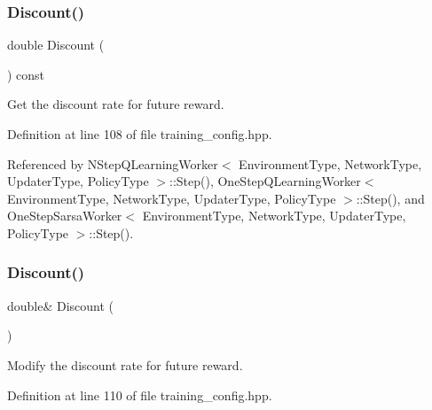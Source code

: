 \subsubsection{Discount()\hspace{0.1cm}{\footnotesize\ttfamily [1/2]}}
{\footnotesize\ttfamily double Discount (\begin{DoxyParamCaption}{ }\end{DoxyParamCaption}) const\hspace{0.3cm}{\ttfamily [inline]}}



Get the discount rate for future reward. 



Definition at line 108 of file training\+\_\+config.\+hpp.



Referenced by N\+Step\+Q\+Learning\+Worker$<$ Environment\+Type, Network\+Type, Updater\+Type, Policy\+Type $>$\+::\+Step(), One\+Step\+Q\+Learning\+Worker$<$ Environment\+Type, Network\+Type, Updater\+Type, Policy\+Type $>$\+::\+Step(), and One\+Step\+Sarsa\+Worker$<$ Environment\+Type, Network\+Type, Updater\+Type, Policy\+Type $>$\+::\+Step().

\mbox{\label{classmlpack_1_1rl_1_1TrainingConfig_acac458c2ea9b4b4f1d48bd9cff986bae}} 
\subsubsection{Discount()\hspace{0.1cm}{\footnotesize\ttfamily [2/2]}}
{\footnotesize\ttfamily double\& Discount (\begin{DoxyParamCaption}{ }\end{DoxyParamCaption})\hspace{0.3cm}{\ttfamily [inline]}}



Modify the discount rate for future reward. 



Definition at line 110 of file training\+\_\+config.\+hpp.

\mbox{\label{classmlpack_1_1rl_1_1TrainingConfig_a5ba88e606db2e58eefb3930c0fe4bbd3}} 
